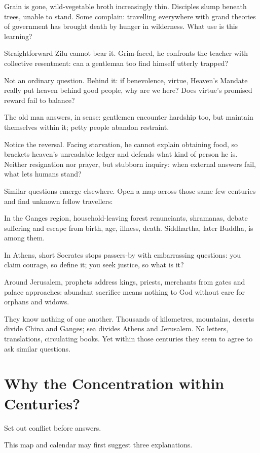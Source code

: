 Grain is gone, wild-vegetable broth increasingly thin. Disciples slump beneath trees, unable to stand. Some complain: travelling everywhere with grand theories of government has brought death by hunger in wilderness. What use is this learning?

Straightforward Zilu cannot bear it. Grim-faced, he confronts the teacher with collective resentment: can a gentleman too find himself utterly trapped?

Not an ordinary question. Behind it: if benevolence, virtue, Heaven's Mandate really put heaven behind good people, why are we here? Does virtue's promised reward fail to balance?

The old man answers, in sense: gentlemen encounter hardship too, but maintain themselves within it; petty people abandon restraint.

Notice the reversal. Facing starvation, he cannot explain obtaining food, so brackets heaven's unreadable ledger and defends what kind of person he is. Neither resignation nor prayer, but stubborn inquiry: when external answers fail, what lets humans stand?

Similar questions emerge elsewhere. Open a map across those same few centuries and find unknown fellow travellers:

In the Ganges region, household-leaving forest renunciants, shramanas, debate suffering and escape from birth, age, illness, death. Siddhartha, later Buddha, is among them.

In Athens, short Socrates stops passers-by with embarrassing questions: you claim courage, so define it; you seek justice, so what is it?

Around Jerusalem, prophets address kings, priests, merchants from gates and palace approaches: abundant sacrifice means nothing to God without care for orphans and widows.

They know nothing of one another. Thousands of kilometres, mountains, deserts divide China and Ganges; sea divides Athens and Jerusalem. No letters, translations, circulating books. Yet within those centuries they seem to agree to ask similar questions.

\section{Why the Concentration within Centuries?}
Set out conflict before answers.

This map and calendar may first suggest three explanations.

